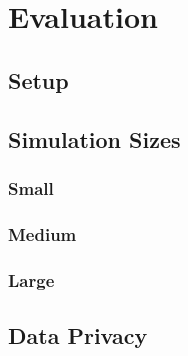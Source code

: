 \chapter{Evaluation}

\section{Setup}
\label{Setup}

\section{Simulation Sizes}
\label{Simulation Sizes}

\subsection{Small}
\label{Small}

\subsection{Medium}
\label{Medium}

\subsection{Large}
\label{Large}

\section{Data Privacy}
\label{Data Privacy}
